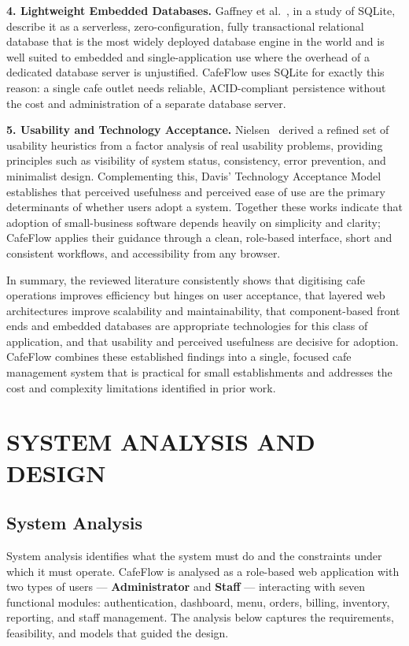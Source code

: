 \documentclass[12pt,a4paper]{report}
\begin{document}
\textbf{4. Lightweight Embedded Databases.}
Gaffney et al.~\cite{lit_sqlite}, in a study of SQLite, describe it as a serverless,
zero-configuration, fully transactional relational database that is the most widely deployed
database engine in the world and is well suited to embedded and single-application use where the
overhead of a dedicated database server is unjustified. CafeFlow uses SQLite for exactly this
reason: a single cafe outlet needs reliable, ACID-compliant persistence without the cost and
administration of a separate database server.

\textbf{5. Usability and Technology Acceptance.}
Nielsen~\cite{lit_usability} derived a refined set of usability heuristics from a factor analysis
of real usability problems, providing principles such as visibility of system status,
consistency, error prevention, and minimalist design. Complementing this, Davis'
Technology Acceptance Model~\cite{lit_tam} establishes that perceived usefulness and perceived
ease of use are the primary determinants of whether users adopt a system. Together these works
indicate that adoption of small-business software depends heavily on simplicity and clarity;
CafeFlow applies their guidance through a clean, role-based interface, short and consistent
workflows, and accessibility from any browser.

In summary, the reviewed literature consistently shows that digitising cafe operations improves
efficiency but hinges on user acceptance, that layered web architectures improve scalability and
maintainability, that component-based front ends and embedded databases are appropriate
technologies for this class of application, and that usability and perceived usefulness are
decisive for adoption. CafeFlow combines these established findings into a single, focused cafe
management system that is practical for small establishments and addresses the cost and
complexity limitations identified in prior work.

\chapter{SYSTEM ANALYSIS AND DESIGN}

\section{System Analysis}
System analysis identifies what the system must do and the constraints under which it must
operate. CafeFlow is analysed as a role-based web application with two types of users —
\textbf{Administrator} and \textbf{Staff} — interacting with seven functional modules:
authentication, dashboard, menu, orders, billing, inventory, reporting, and staff management.
The analysis below captures the requirements, feasibility, and models that guided the design.
\end{document}
